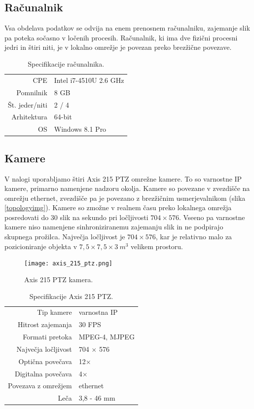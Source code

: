 \documentclass[a4paper, 12pt]{book}
\begin{document}
\subsection{Računalnik}
Vsa obdelava podatkov se odvija na enem prenosnem računalniku, zajemanje slik pa poteka sočasno v ločenih procesih. Računalnik, ki ima dve fizični procesni jedri in štiri niti, je v lokalno omrežje je povezan preko brezžične povezave. 

\begin{table}[H]
\centering
\begin{tabular}{| r | l |}
\hline
CPE & Intel i7-4510U 2.6 GHz \\
Pomnilnik & 8 GB \\
Št. jeder/niti & 2 / 4 \\
Arhitektura & 64-bit \\
OS & Windows 8.1 Pro \\
\hline
\end{tabular}
\caption{Specifikacije računalnika.}
\end{table}

\subsection{Kamere}
V nalogi uporabljamo štiri Axis 215 PTZ omrežne kamere. To so varnostne IP kamere, primarno namenjene nadzoru okolja. Kamere so povezane v zvezdišče na omrežju ethernet, zvezdišče pa je povezano z brezžičnim usmerjevalnikom (slika \ref{topologyimg}).  Kamere so zmožne v realnem času preko lokalnega omrežja posredovati do 30 slik na sekundo pri ločljivosti $704 \times 576$. Vseeno pa varnostne kamere niso namenjene sinhroniziranemu zajemanju slik in ne podpirajo skupnega prožilca. Največja ločljivost je $704 \times 576$, kar je relativno malo za pozicioniranje objekta v $7,5 \times 7,5 \times 3 \ m^3$ velikem prostoru.
\begin{figure}[H]
\centering
\texttt{[image: axis\_215\_ptz.png]}
\caption{Axis 215 PTZ kamera.}
\end{figure}

\begin{table}[H]
\centering
\begin{tabular}{| r | l |}
\hline
Tip kamere & varnostna IP \\
Hitrost zajemanja & 30 FPS \\
Formati pretoka & MPEG-4, MJPEG \\
Največja ločljivost & 704 $\times$ 576 \\
Optična povečava & 12$\times$ \\
Digitalna povečava & 4$\times$ \\
Povezava z omrežjem & ethernet \\
Leča & 3,8 - 46 mm \\
\hline
\end{tabular}
\caption{Specifikacije Axis 215 PTZ.}
\end{table}
\end{document}
